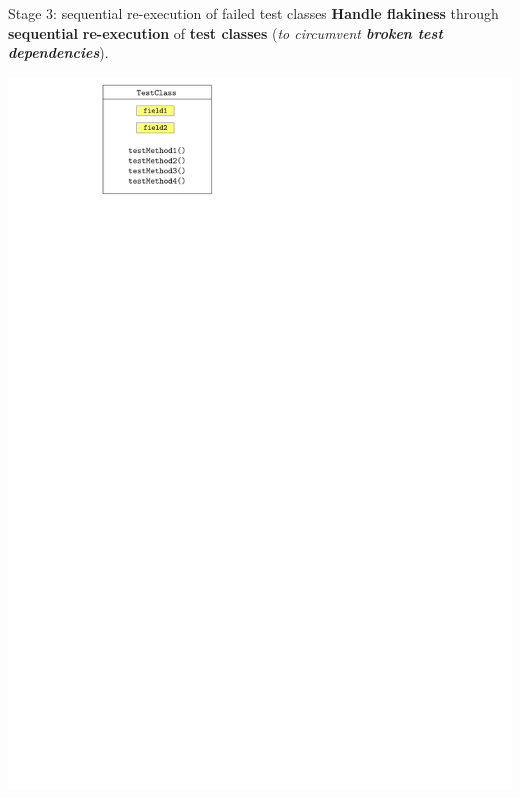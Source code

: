 \documentclass{beamer}
\begin{document}
\begin{frame}{Stage 3: sequential re-execution of failed test classes}
\textbf{Handle flakiness} through \textbf{sequential} {\color{blue}\textbf{re-execution}} of \textbf{\color{indiagreen}test classes} ({\textit{to circumvent {\color{red}\textbf{broken test dependencies}}}}).
	\begin{center}
		\begin{minipage}{0.48\linewidth}
			\centering
			\includegraphics[width=0.85\linewidth,page=1]{images/flakes.pdf}
		\end{minipage}%
		\hfill
		\begin{minipage}{0.48\linewidth}
			\centering

\end{minipage}
\end{center}
\end{frame}
\end{document}
